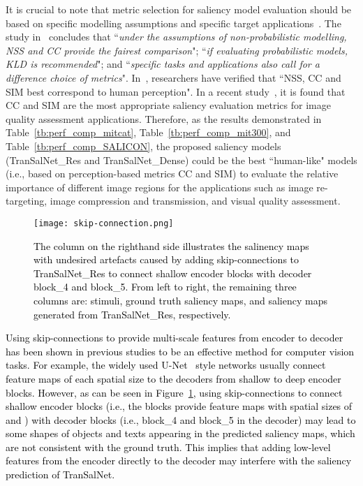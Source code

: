 \documentclass{article}
\begin{document}
It is crucial to note that metric selection for saliency model evaluation should be based on specific modelling assumptions and specific target applications~\cite{Bylinskii_2019}. The study in~\cite{Bylinskii_2019} concludes that ``\textit{under the assumptions of non-probabilistic modelling, NSS and CC provide the fairest comparison}"; ``\textit{if evaluating probabilistic models, KLD is recommended}"; and ``\textit{specific tasks and applications also call for a difference choice of metrics}". In~\cite{LIJ}, researchers have verified that ``NSS, CC and SIM best correspond to human perception". In a recent study~\cite{xiaohan}, it is found that CC and SIM are the most appropriate saliency evaluation metrics for image quality assessment applications. Therefore, as the results demonstrated in Table~\ref{tb:perf_comp_mitcat}, Table~\ref{tb:perf_comp_mit300}, and Table~\ref{tb:perf_comp_SALICON}, the proposed saliency models (TranSalNet\_Res and TranSalNet\_Dense) could be the best ``human-like" models (i.e., based on perception-based metrics CC and SIM) to evaluate the relative importance of different image regions for the applications such as image re-targeting, image compression and transmission, and visual quality assessment.

\begin{figure}
\centering
\texttt{[image: skip-connection.png]}
\caption{\textcolor{black}{The column on the righthand side illustrates the salinency maps with undesired artefacts caused by adding skip-connections to TranSalNet\_Res to connect shallow encoder blocks with decoder block\_4 and block\_5. From left to right, the remaining three columns are: stimuli, ground truth saliency maps, and saliency maps generated from TranSalNet\_Res, respectively. }}
\label{fig:sc}
\end{figure}

\textcolor{black}{Using skip-connections to provide multi-scale features from encoder to decoder has been shown in previous studies to be an effective method for computer vision tasks. For example, the widely used U-Net~\cite{unet} style networks usually connect feature maps of each spatial size to the decoders from shallow to deep encoder blocks. However, as can be seen in Figure~\ref{fig:sc}, using skip-connections to connect shallow encoder blocks (i.e., the blocks provide feature maps with spatial sizes of  and ) with decoder blocks (i.e., block\_4 and block\_5 in the decoder) may lead to some shapes of objects and texts appearing in the predicted saliency maps, which are not consistent with the ground truth. This implies that adding low-level features from the encoder directly to the decoder may interfere with the saliency prediction of TranSalNet.}
\end{document}

